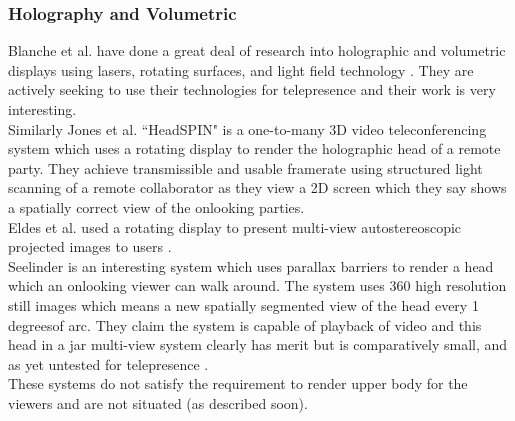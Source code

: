 \subsubsection{Holography and Volumetric}
Blanche et al. have done a great deal of research into holographic and volumetric displays using lasers, rotating surfaces, and light field technology   \cite{Blanche2010,tay2008updatable}. They are actively seeking to use their technologies for telepresence and their work is very interesting.\\
Similarly Jones et al. ``HeadSPIN" is a one-to-many 3D video teleconferencing system \cite{jones2009headspin} which uses a rotating display to render the holographic head of a remote party. They achieve transmissible and usable framerate using structured light scanning of a remote collaborator as they view a 2D screen which they say shows a spatially correct view of the onlooking parties.\\
Eldes et al. used a rotating display to present multi-view autostereoscopic projected images to users \cite{eldes2013multi}.\\
Seelinder is an interesting system which uses parallax barriers to render a head which an onlooking viewer can walk around. The system uses 360 high resolution still images which means a new spatially segmented view of the head every 1 degreesof arc. They claim the system is capable of playback of video and this head in a jar multi-view system clearly has merit but is comparatively small, and as yet untested for telepresence \cite{Yendo2010}.\\
These systems do not satisfy the requirement to render upper body for the viewers and are not situated (as described soon).\\

 

